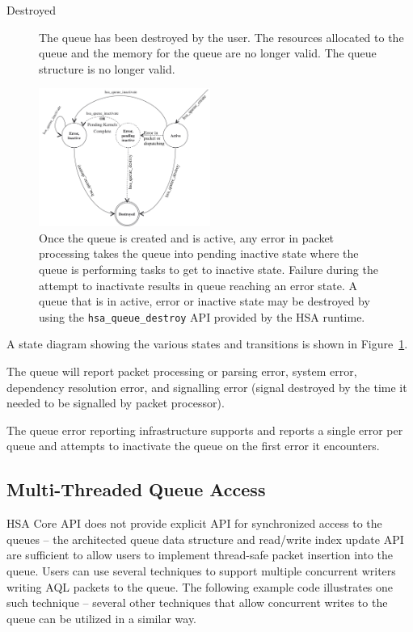 \documentclass{book}
\begin{document}
\begin{description}
\item[Destroyed] The queue has been destroyed by the user.  The
resources allocated to the queue and the memory for the queue are no
longer valid. The queue structure is no longer valid.
\end{description}

\begin{figure}
  \centering
  \includegraphics[width=0.5\textwidth] {fig/queuestate}
  \centering
  \caption{Once the queue is created and is active, any error in
          packet processing takes the queue into pending inactive
          state where the queue is performing tasks to get to
          inactive state. Failure during the attempt to inactivate
          results in queue reaching an error state. A queue that is
          in active, error or inactive state may be destroyed by
          using the \texttt{hsa\_queue\_destroy} API provided by
  the HSA runtime.}
  \label{fig:queuestate}
\end{figure}

A state diagram showing the various states and transitions is shown
in Figure~\ref{fig:queuestate}.

The queue will report packet processing or parsing error, system
error, dependency resolution error, and signalling error (signal
destroyed by the time it needed to be signalled by packet processor).

The queue error reporting infrastructure supports and reports a
single error per queue and attempts to inactivate the queue on the
first error it encounters.

\hypertarget{coreapi_multithreading}{}\subsection{Multi-\/\-Threaded
Queue Access}\label{coreapi_multithreading}
H\-S\-A Core API does not provide explicit API for synchronized
access to the queues -- the architected queue data structure and
read/write index update API are
sufficient to allow users to implement thread-safe packet insertion
into the queue. Users can use several techniques to support
multiple concurrent writers writing AQL packets to the queue.  The
following example code illustrates one such technique -- several
other techniques that allow concurrent writes to the queue can be
utilized in a similar way.
\end{document}
